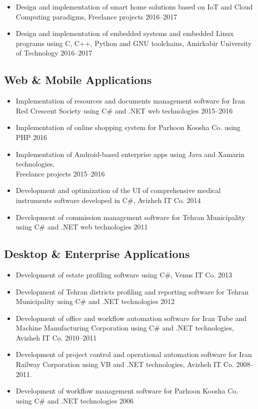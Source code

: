 \documentclass{cv}
\begin{document}
\begin{itemize}

\item
Design and implementation of smart home solutions based on IoT and Cloud Computing paradigms, Freelance projects \hfill 2016--2017
\item
Design and implementation of embedded systems and embedded Linux programs using C, C++, Python and GNU toolchains, Amirkabir University of Technology \hfill 2016--2017

\end{itemize}


\subsection{Web \& Mobile Applications}

\begin{itemize}

\item
Implementation of resources and documents management software for Iran Red Crescent Society using C\# and .NET web technologies \hfill 2015--2016
\item
Implementation of online shopping system for Parhoon Koosha Co. using PHP \hfill 2016
\item
Implementation of Android-based enterprise apps using Java and Xamarin technologies, \\Freelance projects \hfill 2015--2016
\item
Development and optimization of the UI of comprehensive medical instruments software developed in C\#, Avizheh IT Co. \hfill 2014
\item
Development of commission management software for Tehran Municipality using C\# and .NET web technologies \hfill 2011

\end{itemize}


\subsection{Desktop \& Enterprise Applications}

\begin{itemize}

\item
Development of estate profiling software using C\#, Venus IT Co. \hfill 2013
\item
Development of Tehran districts profiling and reporting software for Tehran Municipality using C\# and .NET technologies \hfill 2012
\item
Development of office and workflow automation software for Iran Tube and Machine Manufacturing Corporation using C\# and .NET technologies, Avizheh IT Co. \hfill 2010--2011
\item
Development of project control and operational automation software for Iran Railway Corporation using VB and .NET technologies, Avizheh IT Co. \hfill 2008--2011.
\item
Development of workflow management software for Parhoon Koosha Co. using C\# and .NET technologies \hfill 2006

\end{itemize}
\end{document}
